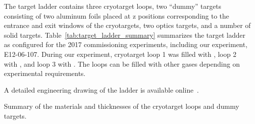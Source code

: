 The target ladder contains three cryotarget loops, two ``dummy'' targets
consisting of two aluminum foils placed at z positions corresponding to the
entrance and exit windows of the cryotargets, two optics targets, and a number
of solid targets.
Table~\ref{tab:target_ladder_summary} summarizes the target ladder as
configured for the 2017 commissioning experiments, including our experiment,
E12-06-107.
During our experiment, cryotarget loop 1 was filled with , loop 2
with , and loop 3 with .
The loops can be filled with other gases depending on experimental
requirements.

A detailed engineering drawing of the ladder is available online~\cite{target_drawing}.
\begin{table}[h]
    \centering
    \caption{Summary of the materials and thicknesses of the cryotarget loops and dummy targets.}
    \label{tab:target_ladder_summary}
    \begin{subtable}[h]{1.0\textwidth}
        \caption{Cryotarget loops and dummy targets}
\end{subtable}
\end{table}
